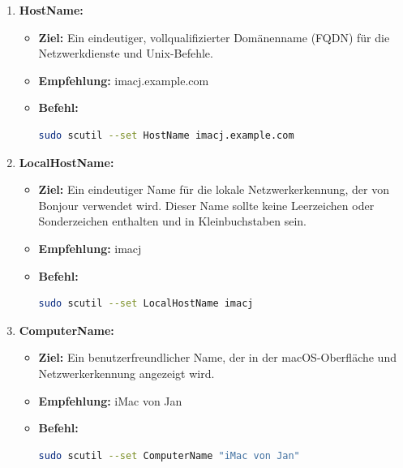 \documentclass{vorlage-design-main}
\begin{document}
\begin{enumerate}
\def\labelenumi{\arabic{enumi}.}

\item
  \textbf{HostName:}

  \begin{itemize}
  \item
    \textbf{Ziel:} Ein eindeutiger, vollqualifizierter Domänenname
    (FQDN) für die Netzwerkdienste und Unix-Befehle.
  \item
    \textbf{Empfehlung:} imacj.example.com
  \item
    \textbf{Befehl:}

\begin{lstlisting}[language=bash]
sudo scutil --set HostName imacj.example.com
\end{lstlisting}
  \end{itemize}
\item
  \textbf{LocalHostName:}

  \begin{itemize}
  \item
    \textbf{Ziel:} Ein eindeutiger Name für die lokale
    Netzwerkerkennung, der von Bonjour verwendet wird. Dieser Name
    sollte keine Leerzeichen oder Sonderzeichen enthalten und in
    Kleinbuchstaben sein.
  \item
    \textbf{Empfehlung:} imacj
  \item
    \textbf{Befehl:}

\begin{lstlisting}[language=bash]
sudo scutil --set LocalHostName imacj
\end{lstlisting}
  \end{itemize}
\item
  \textbf{ComputerName:}

  \begin{itemize}
  \item
    \textbf{Ziel:} Ein benutzerfreundlicher Name, der in der
    macOS-Oberfläche und Netzwerkerkennung angezeigt wird.
  \item
    \textbf{Empfehlung:} iMac von Jan
  \item
    \textbf{Befehl:}

\begin{lstlisting}[language=bash]
sudo scutil --set ComputerName "iMac von Jan"
\end{lstlisting}
  \end{itemize}
\end{enumerate}
\end{document}

